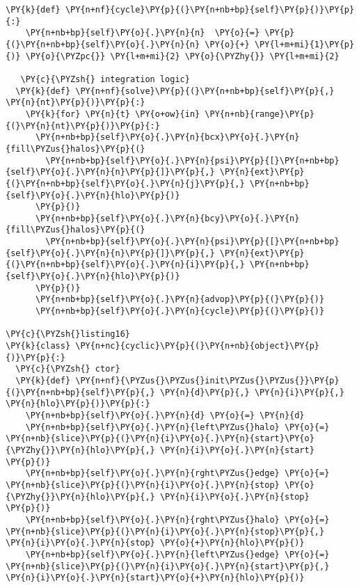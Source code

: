 \begin{Verbatim}[commandchars=\\\{\}]
  \PY{k}{def} \PY{n+nf}{cycle}\PY{p}{(}\PY{n+nb+bp}{self}\PY{p}{)}\PY{p}{:}
    \PY{n+nb+bp}{self}\PY{o}{.}\PY{n}{n}  \PY{o}{=} \PY{p}{(}\PY{n+nb+bp}{self}\PY{o}{.}\PY{n}{n} \PY{o}{+} \PY{l+m+mi}{1}\PY{p}{)} \PY{o}{\PYZpc{}} \PY{l+m+mi}{2} \PY{o}{\PYZhy{}} \PY{l+m+mi}{2}

   \PY{c}{\PYZsh{} integration logic}
  \PY{k}{def} \PY{n+nf}{solve}\PY{p}{(}\PY{n+nb+bp}{self}\PY{p}{,} \PY{n}{nt}\PY{p}{)}\PY{p}{:}
    \PY{k}{for} \PY{n}{t} \PY{o+ow}{in} \PY{n+nb}{range}\PY{p}{(}\PY{n}{nt}\PY{p}{)}\PY{p}{:}
      \PY{n+nb+bp}{self}\PY{o}{.}\PY{n}{bcx}\PY{o}{.}\PY{n}{fill\PYZus{}halos}\PY{p}{(}
        \PY{n+nb+bp}{self}\PY{o}{.}\PY{n}{psi}\PY{p}{[}\PY{n+nb+bp}{self}\PY{o}{.}\PY{n}{n}\PY{p}{]}\PY{p}{,} \PY{n}{ext}\PY{p}{(}\PY{n+nb+bp}{self}\PY{o}{.}\PY{n}{j}\PY{p}{,} \PY{n+nb+bp}{self}\PY{o}{.}\PY{n}{hlo}\PY{p}{)}
      \PY{p}{)}
      \PY{n+nb+bp}{self}\PY{o}{.}\PY{n}{bcy}\PY{o}{.}\PY{n}{fill\PYZus{}halos}\PY{p}{(}
        \PY{n+nb+bp}{self}\PY{o}{.}\PY{n}{psi}\PY{p}{[}\PY{n+nb+bp}{self}\PY{o}{.}\PY{n}{n}\PY{p}{]}\PY{p}{,} \PY{n}{ext}\PY{p}{(}\PY{n+nb+bp}{self}\PY{o}{.}\PY{n}{i}\PY{p}{,} \PY{n+nb+bp}{self}\PY{o}{.}\PY{n}{hlo}\PY{p}{)}
      \PY{p}{)}
      \PY{n+nb+bp}{self}\PY{o}{.}\PY{n}{advop}\PY{p}{(}\PY{p}{)} 
      \PY{n+nb+bp}{self}\PY{o}{.}\PY{n}{cycle}\PY{p}{(}\PY{p}{)}
  
\PY{c}{\PYZsh{}listing16}
\PY{k}{class} \PY{n+nc}{cyclic}\PY{p}{(}\PY{n+nb}{object}\PY{p}{)}\PY{p}{:}
  \PY{c}{\PYZsh{} ctor}
  \PY{k}{def} \PY{n+nf}{\PYZus{}\PYZus{}init\PYZus{}\PYZus{}}\PY{p}{(}\PY{n+nb+bp}{self}\PY{p}{,} \PY{n}{d}\PY{p}{,} \PY{n}{i}\PY{p}{,} \PY{n}{hlo}\PY{p}{)}\PY{p}{:} 
    \PY{n+nb+bp}{self}\PY{o}{.}\PY{n}{d} \PY{o}{=} \PY{n}{d}
    \PY{n+nb+bp}{self}\PY{o}{.}\PY{n}{left\PYZus{}halo} \PY{o}{=} \PY{n+nb}{slice}\PY{p}{(}\PY{n}{i}\PY{o}{.}\PY{n}{start}\PY{o}{\PYZhy{}}\PY{n}{hlo}\PY{p}{,} \PY{n}{i}\PY{o}{.}\PY{n}{start}    \PY{p}{)}
    \PY{n+nb+bp}{self}\PY{o}{.}\PY{n}{rght\PYZus{}edge} \PY{o}{=} \PY{n+nb}{slice}\PY{p}{(}\PY{n}{i}\PY{o}{.}\PY{n}{stop} \PY{o}{\PYZhy{}}\PY{n}{hlo}\PY{p}{,} \PY{n}{i}\PY{o}{.}\PY{n}{stop}     \PY{p}{)}
    \PY{n+nb+bp}{self}\PY{o}{.}\PY{n}{rght\PYZus{}halo} \PY{o}{=} \PY{n+nb}{slice}\PY{p}{(}\PY{n}{i}\PY{o}{.}\PY{n}{stop}\PY{p}{,}      \PY{n}{i}\PY{o}{.}\PY{n}{stop} \PY{o}{+}\PY{n}{hlo}\PY{p}{)}
    \PY{n+nb+bp}{self}\PY{o}{.}\PY{n}{left\PYZus{}edge} \PY{o}{=} \PY{n+nb}{slice}\PY{p}{(}\PY{n}{i}\PY{o}{.}\PY{n}{start}\PY{p}{,}     \PY{n}{i}\PY{o}{.}\PY{n}{start}\PY{o}{+}\PY{n}{hlo}\PY{p}{)}


\end{Verbatim}
